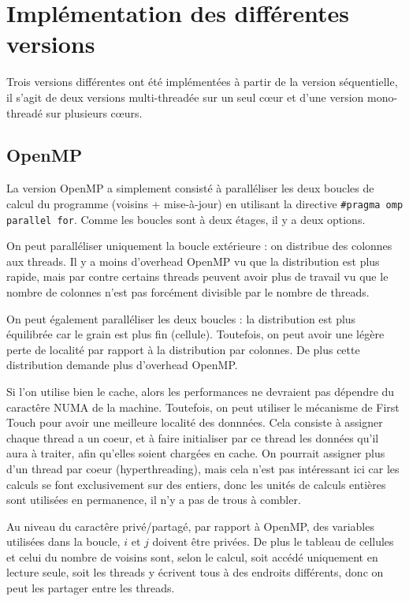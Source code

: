 \section{Implémentation des différentes versions}

Trois versions différentes ont été implémentées à partir de la version séquentielle, il s'agit de deux versions multi-threadée sur un seul c\oe ur et d'une version mono-threadé sur plusieurs c\oe urs.

\subsection{OpenMP}

La version OpenMP a simplement consisté à paralléliser les deux boucles de calcul du programme (voisins + mise-à-jour) en utilisant la directive \texttt{\#pragma omp parallel for}. Comme les boucles sont à deux étages, il y a deux options.

On peut paralléliser uniquement la boucle extérieure : on distribue des colonnes aux threads. Il y a moins d'overhead OpenMP vu que la distribution est plus rapide, mais par contre certains threads peuvent avoir plus de travail vu que le nombre de colonnes n'est pas forcément divisible par le nombre de threads.

On peut également paralléliser les deux boucles : la distribution est plus équilibrée car le grain est plus fin (cellule). Toutefois, on peut avoir une légère perte de localité par rapport à la distribution par colonnes. De plus cette distribution demande plus d'overhead OpenMP.

Si l'on utilise bien le cache, alors les performances ne devraient pas dépendre du caractêre NUMA de la machine. Toutefois, on peut utiliser le mécanisme de First Touch pour avoir une meilleure localité des donnnées. Cela consiste à assigner chaque thread a un coeur, et à faire initialiser par ce thread les données qu'il aura à traiter, afin qu'elles soient chargées en cache. On pourrait assigner plus d'un thread par coeur (hyperthreading), mais cela n'est pas intéressant ici car les calculs se font exclusivement sur des entiers, donc les unités de calculs entières sont utilisées en permanence, il n'y a pas de trous à combler.

Au niveau du caractêre privé/partagé, par rapport à OpenMP, des variables utilisées dans la boucle, $i$ et $j$ doivent être privées. De plus le tableau de cellules et celui du nombre de voisins sont, selon le calcul, soit accédé uniquement en lecture seule, soit les threads y écrivent tous à des endroits différents, donc on peut les partager entre les threads.

